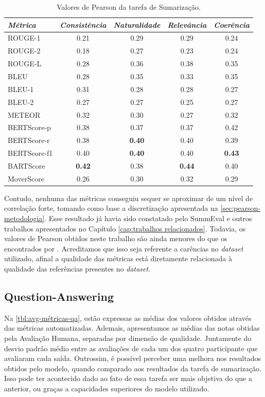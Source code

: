 \documentclass[cic,tc]{iiufrgs}
\begin{document}
\begin{table}[htbp]
    \caption{Valores de Pearson da tarefa de Sumarização.}
    \centering
        \begin{tabular}{l c c c c}
          \hline
          \textit{Métrica} & \textit{Consistência} & \textit{Naturalidade} & \textit{Relevância} & \textit{Coerência} \\
          \hline
          \hline
          ROUGE-1 & 0.21 & 0.29 & 0.29 & 0.24\\
          ROUGE-2 & 0.18 & 0.27 & 0.23 & 0.24\\
          ROUGE-L & 0.28 & 0.36 & 0.38 & 0.35\\
          BLEU    & 0.28 & 0.35 & 0.33 & 0.35\\
          BLEU-1  & 0.31 & 0.28 & 0.28 & 0.27\\
          BLEU-2  & 0.27 & 0.27 & 0.25 & 0.27\\
          METEOR  & 0.32 & 0.30 & 0.27 & 0.32\\
          \hline
          BERTScore-p  & 0.38 & 0.37 & 0.37 & 0.42\\
          BERTScore-r  & 0.38 & \textbf{0.40} & 0.40 & 0.39\\
          BERTScore-f1 & 0.40 & \textbf{0.40} & 0.40 & \textbf{0.43}\\
          BARTScore    & \textbf{0.42} & 0.38 & \textbf{0.44} & 0.40\\
          MoverScore   & 0.26 & 0.30 & 0.32 & 0.29\\
          \hline
        \end{tabular}
    \label{tbl:resultados-summ}
\end{table}

Contudo, nenhuma das métricas conseguiu sequer se aproximar de um nível de correlação forte, tomando como base a discretização apresentada na \autoref{sec:pearson-metodologia}. Esse resultado já havia sido constatado pelo SummEval \cite{fabbri2021summeval} e outros trabalhos apresentados no Capítulo \ref{cap:trabalhos relacionados}. Todavia, os valores de Pearson obtidos neste trabalho são ainda menores do que os encontrados por \citet{fabbri2021summeval}. Acreditamos que isso seja referente a carências no \textit{dataset} utilizado, afinal a qualidade das métricas está diretamente relacionada à qualidade das referências presentes no \textit{dataset}.

\subsection{Question-Answering}
\label{sec:qa-results}
Na \autoref{tbl:avg-métricas-qa}, estão expressas as médias dos valores obtidos através das métricas automatizadas. Ademais, apresentamos as médias das notas obtidas pela Avaliação Humana, separadas por dimensão de qualidade. Juntamente do desvio padrão médio entre as avaliações de cada um dos quatro participante que avaliaram cada saída. 
Outrossim, é possível perceber uma melhora nos resultados obtidos pelo modelo, quando comparado aos resultados da tarefa de sumarização. Isso pode ter acontecido dado ao fato de essa tarefa ser mais objetiva do que a anterior, ou graças a capacidades superiores do modelo utilizado.
\end{document}
